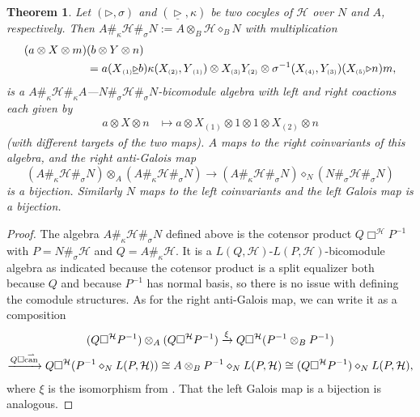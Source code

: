 \documentclass[a4paper,reqno]{amsart}
\numberwithin{equation}{section}
\theoremstyle{plain}
\newtheorem{thm}{Theorem}[section]
\theoremstyle{remark}
\numberwithin{equation}{section}
\newcommand\inv{^{-1}}
\newcommand{\ot}{\otimes}
\newcommand{\rcan}{\overset\rightharpoonup\can}
\renewcommand{\o}{{}_{\scriptscriptstyle{(1)}}}
\renewcommand{\t}{{}_{\scriptscriptstyle{(2)}}}
\newcommand{\di}{{\diamond_{B}}}
\newcommand\ou[1]{\otimes_{#1}}
\newcommand{\la}{{\triangleright}}
\newcommand{\CH}{\mathcal{H}}
\newcommand{\can}{{\rm can}}
\begin{document}
\newcommand\laa{\underline\triangleright}
\begin{thm}\label{cm-bigalois}
    Let $(\la,\sigma)$ and $(\laa,\kappa)$ be two cocyles of $\CH$ over $N$ and $A$, respectively. Then
    $A\#_{\kappa}\CH\#_{\sigma}N:=A\ot_{B} \CH\di N$
    with multiplication
     \begin{align}\label{equ. twist on two side products1}
         (a\ot X\ot m)&(b\ot Y\ot n)\\&\notag=a(X\o\laa b)\kappa(X_{\scriptscriptstyle{(2)}}, Y\o)\ot X_{\scriptscriptstyle{(3)}}Y_{\scriptscriptstyle{(2)}}\ot \sigma^{-1}(X_{\scriptscriptstyle{(4)}}, Y_{\scriptscriptstyle{(3)}})(X_{\scriptscriptstyle{(5)}}\la n)m,
      \end{align}
      is a $A\#_\kappa\CH\#_\kappa A$---$N\#_\sigma\CH\#_\sigma N$-bicomodule algebra with left and right coactions each given by
      \begin{align*}
          a\ot X\ot n&\mapsto a\ot X\o\ot 1\ot 1\ot X\t\ot n
      \end{align*}
      (with different targets of the two maps).
      $A$ maps to the right coinvariants of this algebra, and the right anti-Galois map
      \[(A\#_{\kappa}\CH\#_{\sigma}N)\ou A(A\#_{\kappa}\CH\#_{\sigma}N)\to (A\#_{\kappa}\CH\#_{\sigma}N)\diamond_N (N\#_\sigma\CH\#_\sigma N)\]
      is a bijection. Similarly $N$ maps to the left coinvariants and the left Galois map is a bijection.
\end{thm}
\begin{proof}
    The algebra $A\#_{\kappa}\CH\#_{\sigma}N$ defined above is the cotensor product $Q\Box^\CH P\inv$ with $P=N\#_\sigma\CH$ and $Q=A\#_\kappa\CH$. It is a $L(Q,\CH)$-$L(P,\CH)$-bicomodule algebra as indicated because the cotensor product is a split equalizer both because $Q$ and because $P\inv$ has normal basis, so there is no issue with defining the comodule structures. As for the right anti-Galois map, we can write it as a composition
    \begin{multline*}(Q\Box^\CH P\inv)\ou A(Q\Box^\CH P\inv)\xrightarrow\xi Q\Box^\CH(P\inv\ou BP\inv)\\\xrightarrow{Q\Box\rcan}Q\Box^\CH(P\inv\diamond_N L(P,\CH))\cong
    A\ou BP\inv\diamond_NL(P,\CH)
    \cong (Q\Box^\CH P\inv)\diamond_NL(P,\CH),\end{multline*}
    where $\xi$ is the isomorphism from . That the left Galois map is a bijection is analogous.
\end{proof}
\end{document}
